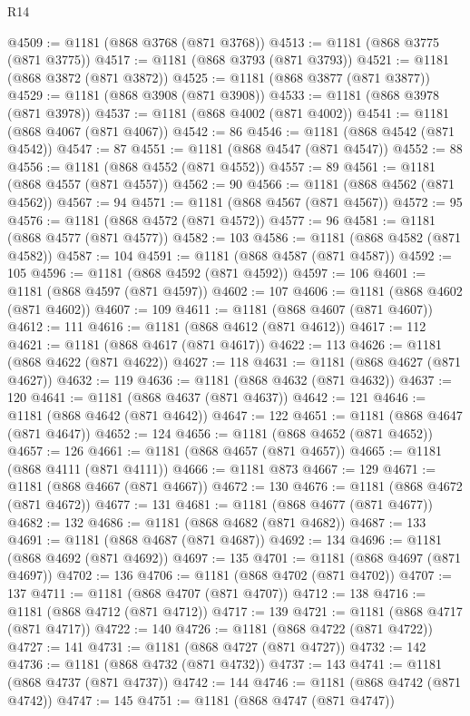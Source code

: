 \begin{lexlean}{R14}
\begin{coremodule}
@4509 := @1181 (@868 @3768 (@871 @3768))
@4513 := @1181 (@868 @3775 (@871 @3775))
@4517 := @1181 (@868 @3793 (@871 @3793))
@4521 := @1181 (@868 @3872 (@871 @3872))
@4525 := @1181 (@868 @3877 (@871 @3877))
@4529 := @1181 (@868 @3908 (@871 @3908))
@4533 := @1181 (@868 @3978 (@871 @3978))
@4537 := @1181 (@868 @4002 (@871 @4002))
@4541 := @1181 (@868 @4067 (@871 @4067))
@4542 := 86
@4546 := @1181 (@868 @4542 (@871 @4542))
@4547 := 87
@4551 := @1181 (@868 @4547 (@871 @4547))
@4552 := 88
@4556 := @1181 (@868 @4552 (@871 @4552))
@4557 := 89
@4561 := @1181 (@868 @4557 (@871 @4557))
@4562 := 90
@4566 := @1181 (@868 @4562 (@871 @4562))
@4567 := 94
@4571 := @1181 (@868 @4567 (@871 @4567))
@4572 := 95
@4576 := @1181 (@868 @4572 (@871 @4572))
@4577 := 96
@4581 := @1181 (@868 @4577 (@871 @4577))
@4582 := 103
@4586 := @1181 (@868 @4582 (@871 @4582))
@4587 := 104
@4591 := @1181 (@868 @4587 (@871 @4587))
@4592 := 105
@4596 := @1181 (@868 @4592 (@871 @4592))
@4597 := 106
@4601 := @1181 (@868 @4597 (@871 @4597))
@4602 := 107
@4606 := @1181 (@868 @4602 (@871 @4602))
@4607 := 109
@4611 := @1181 (@868 @4607 (@871 @4607))
@4612 := 111
@4616 := @1181 (@868 @4612 (@871 @4612))
@4617 := 112
@4621 := @1181 (@868 @4617 (@871 @4617))
@4622 := 113
@4626 := @1181 (@868 @4622 (@871 @4622))
@4627 := 118
@4631 := @1181 (@868 @4627 (@871 @4627))
@4632 := 119
@4636 := @1181 (@868 @4632 (@871 @4632))
@4637 := 120
@4641 := @1181 (@868 @4637 (@871 @4637))
@4642 := 121
@4646 := @1181 (@868 @4642 (@871 @4642))
@4647 := 122
@4651 := @1181 (@868 @4647 (@871 @4647))
@4652 := 124
@4656 := @1181 (@868 @4652 (@871 @4652))
@4657 := 126
@4661 := @1181 (@868 @4657 (@871 @4657))
@4665 := @1181 (@868 @4111 (@871 @4111))
@4666 := @1181 @873
@4667 := 129
@4671 := @1181 (@868 @4667 (@871 @4667))
@4672 := 130
@4676 := @1181 (@868 @4672 (@871 @4672))
@4677 := 131
@4681 := @1181 (@868 @4677 (@871 @4677))
@4682 := 132
@4686 := @1181 (@868 @4682 (@871 @4682))
@4687 := 133
@4691 := @1181 (@868 @4687 (@871 @4687))
@4692 := 134
@4696 := @1181 (@868 @4692 (@871 @4692))
@4697 := 135
@4701 := @1181 (@868 @4697 (@871 @4697))
@4702 := 136
@4706 := @1181 (@868 @4702 (@871 @4702))
@4707 := 137
@4711 := @1181 (@868 @4707 (@871 @4707))
@4712 := 138
@4716 := @1181 (@868 @4712 (@871 @4712))
@4717 := 139
@4721 := @1181 (@868 @4717 (@871 @4717))
@4722 := 140
@4726 := @1181 (@868 @4722 (@871 @4722))
@4727 := 141
@4731 := @1181 (@868 @4727 (@871 @4727))
@4732 := 142
@4736 := @1181 (@868 @4732 (@871 @4732))
@4737 := 143
@4741 := @1181 (@868 @4737 (@871 @4737))
@4742 := 144
@4746 := @1181 (@868 @4742 (@871 @4742))
@4747 := 145
@4751 := @1181 (@868 @4747 (@871 @4747))

\end{coremodule}
\end{lexlean}
